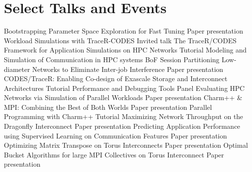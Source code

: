 \section{Select Talks and Events}
    {Bootstrapping Parameter Space Exploration for Fast Tuning}
    {Paper presentation}
    {}{}
		{Workload Simulations with TraceR-CODES}
		{Invited talk}
		{}{}
		{The TraceR/CODES Framework for Application Simulations on HPC Networks}
		{Tutorial}
		{}{}
		{Modeling and Simulation of Communication in HPC systems}
		{BoF Session}
		{}{}
		{Partitioning Low-diameter Networks to Eliminate Inter-job Interference}
    {Paper presentation}
		{}{}
		{CODES/TraceR: Enabling Co-design of Exascale Storage and Interconnect Architectures}
		{Tutorial}
		{}{}
		{Performance and Debugging Tools}
		{Panel}
		{}{}
		{Evaluating HPC Networks via Simulation of Parallel Workloads}
    {Paper presentation}
		{}{}
		{Charm++ \& MPI: Combining the Best of Both Worlds}
    {Paper presentation}
		{}{}
		{Parallel Programming with Charm++}
		{Tutorial}
		{}{}
		{Maximizing Network Throughput on the Dragonfly Interconnect}
    {Paper presentation}
		{}{}
		{Predicting Application Performance using Supervised Learning on Communication Features}
    {Paper presentation}
		{}{}
		{Optimizing Matrix Transpose on Torus Interconnects}
    {Paper presentation}
		{}{}
		{Optimal Bucket Algorithms for large MPI Collectives on Torus Interconnect}
    {Paper presentation}
		{}{}


